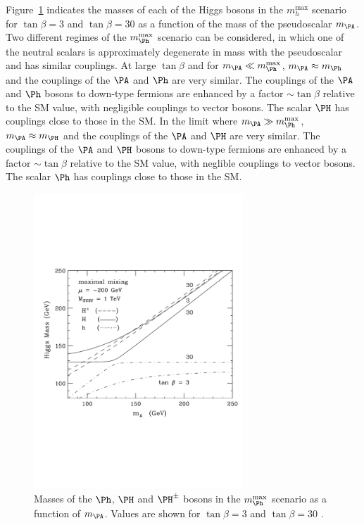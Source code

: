 Figure~\ref{fig:mhmaxmasses} indicates the
masses of each of the Higgs bosons in the $m_{h}^{\text{max}}$ scenario
for $\tan\beta=3$ and $\tan\beta=30$ as a function of the mass of the
pseudoscalar $m_{\PA}$. Two different regimes of the $m_{\Ph}^{\text{max}}$
scenario can be considered, in which one of the neutral scalars is approximately
degenerate in mass with the pseudoscalar and has similar couplings. 
At large $\tan\beta$ and for $m_{\PA} \ll m_{\Ph}^{\text{max}}$, $m_{\PA}
\approx m_{\Ph}$ and the couplings of the $\PA$ and $\Ph$ are very similar. The
couplings of the $\PA$ and $\Ph$ bosons to down-type fermions 
are enhanced by a factor $\sim \tan\beta$ relative to the \ac{SM} value, with
negligible couplings to vector bosons. The scalar $\PH$ has couplings
close to those in the \ac{SM}. In the limit where $m_{\PA} \gg
m_{\Ph}^{\text{max}}$, 
$m_{\PA} \approx m_{\PH}$ and the couplings of the $\PA$ and $\PH$ are
very similar. The couplings of the $\PA$ and $\PH$ bosons to down-type fermions 
are enhanced by a factor $\sim \tan\beta$ relative to the \ac{SM} value, 
with neglible couplings to vector bosons. The scalar $\Ph$ has couplings
close to those in the \ac{SM}. 

\begin{figure}[htbp]
   \includegraphics[width=0.7\textwidth]{plots/theory/mssm_masses_mhmax.pdf}
\caption[Masses of the $\Ph$, $\PH$ and $\PH^{\pm}$ bosons in the
$m_{\Ph}^{\text{max}}$ scenario as a function of $m_{\PA}$.]{Masses of the $\Ph$, $\PH$ and $\PH^{\pm}$ bosons in the
$m_{\Ph}^{\text{max}}$ scenario as a function of $m_{\PA}$. Values are shown for
$\tan\beta=3$ and $\tan\beta=30$ \cite{Carena:2002es}.}
\label{fig:mhmaxmasses}
\end{figure}

